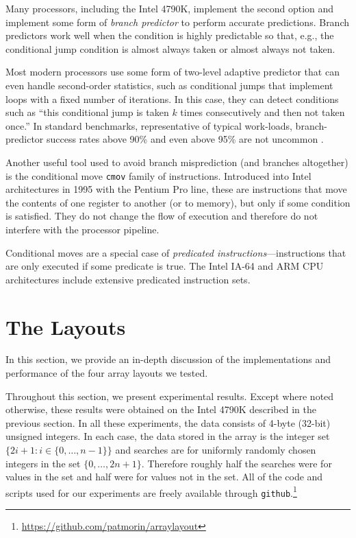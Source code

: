 \documentclass{patmorin}
\begin{document}
Many processors, including the Intel 4790K, implement the second
option and implement some form of \emph{branch predictor} to perform
accurate predictions.  Branch predictors work well when the condition
is highly predictable so that, e.g., the conditional jump condition is
almost always taken or almost always not taken.

Most modern processors use some form of two-level adaptive predictor
\cite{yeh.patt:two-level} that can even handle second-order statistics,
such as conditional jumps that implement loops with a fixed number of
iterations. In this case, they can detect conditions such as ``this
conditional jump is taken $k$ times consecutively and then not taken
once.''  In standard benchmarks, representative of typical work-loads,
branch-predictor success rates above 90\% and even above 95\% are not
uncommon \cite{yeh.patt:alternative}.

Another useful tool used to avoid branch misprediction (and branches
altogether) is the conditional move \texttt{cmov} family
of instructions.  Introduced into Intel architectures in 1995 with
the Pentium Pro line, these are instructions that move the contents of
one register to another (or to memory), but only if some condition is
satisfied. They do not change the flow of execution and therefore do
not interfere with the processor pipeline.

Conditional moves are a special case of \emph{predicated
instructions}---instructions that are only executed if some predicate
is true.  The Intel IA-64 and ARM CPU architectures include extensive
predicated instruction sets.

\section{The Layouts}

In this section, we provide an in-depth discussion of the implementations
and performance of the four array layouts we tested.

Throughout this section, we present experimental results. Except where
noted otherwise, these results were obtained on the Intel 4790K described
in the previous section.  In all these experiments, the data consists of
4-byte (32-bit) unsigned integers. In each case, the data stored in the
array is the integer set $\{2i+1: i\in\{0,\ldots,n-1\}\}$ and searches are
for uniformly randomly chosen integers in the set $\{0,\ldots,2n+1\}$.
Therefore roughly half the searches were for values in the set and half
were for values not in the set.
All of the code and scripts used for our
experiments are freely available through
\texttt{github}.\footnote{\url{https://github.com/patmorin/arraylayout}}
\end{document}
